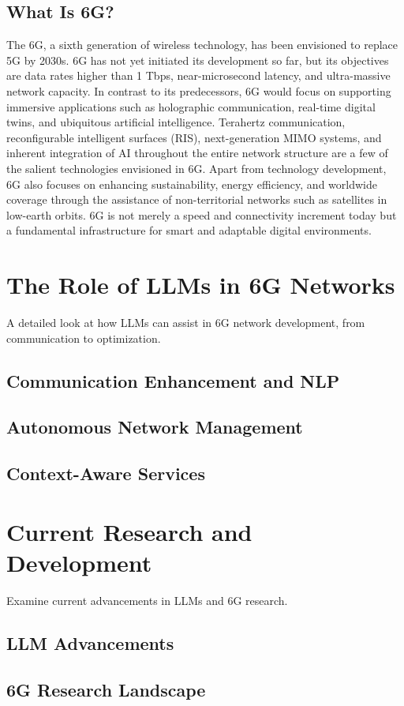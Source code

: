 \documentclass[12pt]{article}
\begin{document}
	\subsection{What Is 6G?}
	The 6G, a sixth generation of wireless technology, has been envisioned to replace 5G by 2030s. 6G has not yet initiated its development so far, but its objectives are data rates higher than 1 Tbps, near-microsecond latency, and ultra-massive network capacity. In contrast to its predecessors, 6G would focus on supporting immersive applications such as holographic communication, real-time digital twins, and ubiquitous artificial intelligence. Terahertz communication, reconfigurable intelligent surfaces (RIS), next-generation MIMO systems, and inherent integration of AI throughout the entire network structure are a few of the salient technologies envisioned in 6G. Apart from technology development, 6G also focuses on enhancing sustainability, energy efficiency, and worldwide coverage through the assistance of non-territorial networks such as satellites in low-earth orbits. 6G is not merely a speed and connectivity increment today but a fundamental infrastructure for smart and adaptable digital environments.
\newpage
\section{The Role of LLMs in 6G Networks}
A detailed look at how LLMs can assist in 6G network development, from communication to optimization.
	\subsection{Communication Enhancement and NLP}
	\subsection{Autonomous Network Management}
	\subsection{Context-Aware Services}
\newpage
\section{Current Research and Development}
Examine current advancements in LLMs and 6G research.
	\subsection{LLM Advancements}
	\subsection{6G Research Landscape}
\end{document}
